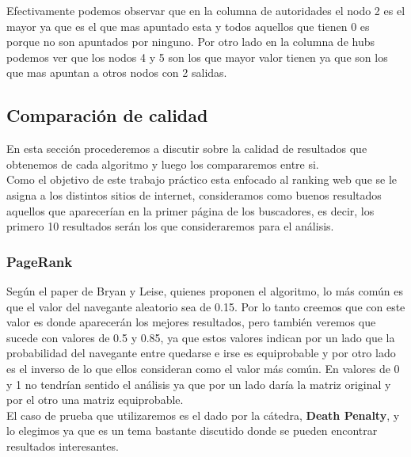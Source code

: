 Efectivamente podemos observar que en la columna de autoridades el nodo 2 es el mayor ya que es el que mas apuntado esta y todos aquellos que tienen 0 es porque no son apuntados por ninguno. Por otro lado en la columna de hubs podemos ver que los nodos 4 y 5 son los que mayor valor tienen ya que son los que mas apuntan a otros nodos con 2 salidas.

\subsection{Comparación de calidad}

En esta sección procederemos a discutir sobre la calidad de resultados que obtenemos de cada algoritmo y luego los compararemos entre si.\\
Como el objetivo de este trabajo práctico esta enfocado al ranking web que se le asigna a los distintos sitios de internet, consideramos como buenos resultados aquellos que aparecerían en la primer página de los buscadores, es decir, los primero 10 resultados serán los que consideraremos para el análisis.

\subsubsection{PageRank}
Según el paper de Bryan y Leise, quienes proponen el algoritmo, lo más común es que el valor del navegante aleatorio sea de 0.15. Por lo tanto creemos que con este valor es donde aparecerán los mejores resultados, pero también veremos que sucede con valores de 0.5 y 0.85, ya que estos valores indican por un lado que la probabilidad del navegante entre quedarse e irse es equiprobable y por otro lado es el inverso de lo que ellos consideran como el valor más común. En valores de 0 y 1 no tendrían sentido el análisis ya que por un lado daría la matriz original y por el otro una matriz equiprobable.\\
El caso de prueba que utilizaremos es el dado por la cátedra, \textbf{Death Penalty}, y lo elegimos ya que es un tema bastante discutido donde se pueden encontrar resultados interesantes.


